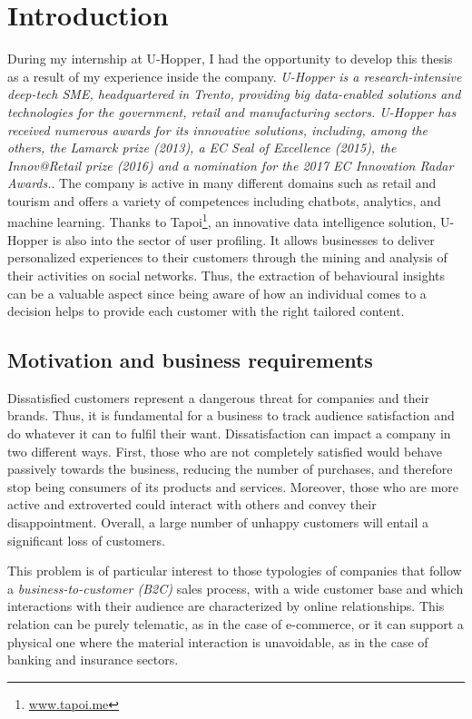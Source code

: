 \chapter{Introduction}
\label{cha:introduction}

During my internship at U-Hopper, I had the opportunity to develop this thesis as a result of my experience inside the company. 
\textit{ U-Hopper is a research-intensive deep-tech SME, headquartered in Trento, providing big data-enabled solutions and technologies for the government, retail and manufacturing sectors. U-Hopper has received numerous awards for its innovative solutions, including, among the others, the Lamarck prize (2013), a EC Seal of Excellence (2015), the Innov@Retail prize (2016) and a nomination for the 2017 EC Innovation Radar Awards.}.
The company is active in many different domains such as retail and tourism and offers a variety of competences including chatbots, analytics, and machine learning.
Thanks to Tapoi\footnote{\url{www.tapoi.me}}, an innovative data intelligence solution, U-Hopper is also into the sector of user profiling.
It allows businesses to deliver personalized experiences to their customers through the mining and analysis of their activities on social networks.
Thus, the extraction of behavioural insights can be a valuable aspect since being aware of how an individual comes to a decision helps to provide each customer with the right tailored content.


\section{Motivation and business requirements}
Dissatisfied customers represent a dangerous threat for companies and their brands. Thus, it is fundamental for a business to track audience satisfaction and do whatever it can to fulfil their want.
Dissatisfaction can impact a company in two different ways. 
First, those who are not completely satisfied would behave passively towards the business, reducing the number of purchases, and therefore stop being consumers of its products and services.
Moreover, those who are more active and extroverted could interact with others and convey their disappointment.
Overall, a large number of unhappy customers will entail a significant loss of customers.

This problem is of particular interest to those typologies of companies that follow a \emph{business-to-customer (B2C)} sales process,
with a wide customer base and which interactions with their audience are characterized by online relationships.
This relation can be purely telematic, as in the case of e-commerce, or it can support a physical one where the material interaction is unavoidable, as in the case of banking and insurance sectors.

